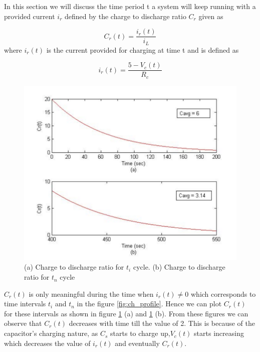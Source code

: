 In this section we will discuss the time period t a system will keep running with a provided current  $i_r$ defined by the charge to discharge ratio $C_r$ given as

\begin{equation}\label{eq:cdr}
 C_r(t) = \frac{i_r(t)}{i_L}
\end{equation}
where $i_r(t)$ is the current provided for charging at time t and is defined as

\begin{equation}\label{eq:ir}
 i_r(t) = \frac {5-V_c(t)}{R_c}
\end{equation}

\begin{figure}[h!]
\centering
\includegraphics[width=1\textwidth]{ctd2.pdf}
\caption{(a) Charge to discharge ratio for $t_i$ cycle. (b) Charge to discharge ratio for $t_n$ cycle}
\label{fig:crs}
\end{figure}

$C_r(t)$ is only meaningful during the time when $i_r(t) \neq 0$ which corresponds to time intervals $t_i$ and $t_n$ in the figure \ref{fig:ch_profile}. Hence we can plot $C_r(t)$ for these intervals as shown in figure \ref{fig:crs} (a) and \ref{fig:crs} (b). From these figures we can observe that $ C_r(t)$ decreases with time till the value of 2. This is because of the capacitor's charging nature, as $C_s$ starts to charge up,$ V_c(t)$ starts increasing which decreases the value of $ i_r(t)$ and eventually $C_r(t)$. 

